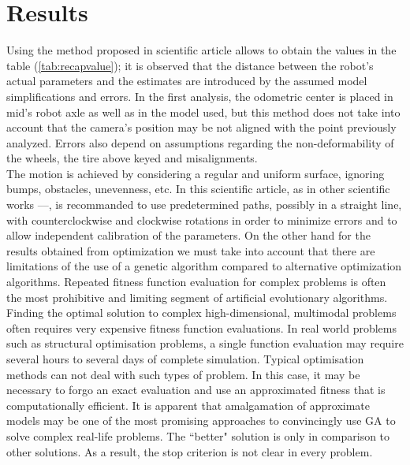 \section{Results}
Using the method proposed in scientific article \cite{1512356} allows to obtain the values in the table (\ref{tab:recapvalue}); it is observed that the distance between the robot’s actual parameters and the estimates are introduced by the assumed model simplifications and errors.
In the first analysis, the odometric center is placed in mid’s robot axle as well as in the model used, but this method does not take into account that the camera’s position may be not aligned with the point previously analyzed.
Errors also depend on assumptions regarding the non-deformability of the wheels, the tire above keyed and misalignments.\\ 
The motion is achieved by considering a regular and uniform surface, ignoring bumps, obstacles, unevenness, etc. 
In this scientific article, as in other scientific works \cite{censi13joint}--\cite{Jung2016}--\cite{DBLP:journals/ijrr/ChongK99}, is recommanded to use predetermined paths, possibly in a straight line, with counterclockwise and clockwise rotations in order to minimize errors and to allow independent calibration of the parameters.
On the other hand for the results obtained from optimization we must take into account that there are limitations of the use of a genetic algorithm compared to alternative optimization algorithms.
Repeated fitness function evaluation for complex problems is often the most prohibitive and limiting segment of artificial evolutionary algorithms. Finding the optimal solution to complex high-dimensional, multimodal problems often requires very expensive fitness function evaluations. In real world problems such as structural optimisation problems, a single function evaluation may require several hours to several days of complete simulation. Typical optimisation methods can not deal with such types of problem. In this case, it may be necessary to forgo an exact evaluation and use an approximated fitness that is computationally efficient. It is apparent that amalgamation of approximate models may be one of the most promising approaches to convincingly use GA to solve complex real-life problems.
The ``better" solution is only in comparison to other solutions. As a result, the stop criterion is not clear in every problem.

